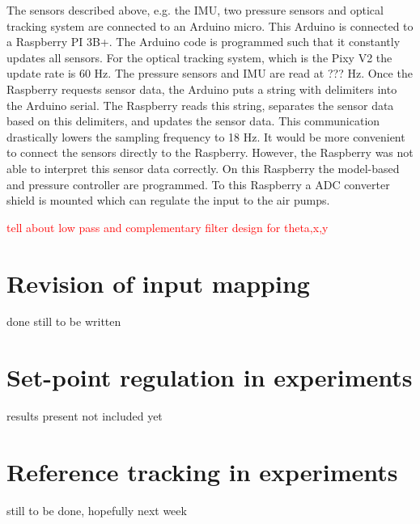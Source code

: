 The sensors described above, e.g. the IMU, two pressure sensors and optical tracking system are connected to an Arduino micro. This Arduino is connected to a Raspberry PI 3B+. The Arduino code is programmed such that it constantly updates all sensors. For the optical tracking system, which is the Pixy V2 the update rate is 60 Hz. The pressure sensors and IMU are read at ??? Hz. Once the Raspberry requests sensor data, the Arduino puts a string with delimiters into the Arduino serial. The Raspberry reads this string, separates the sensor data based on this delimiters, and updates the sensor data. This communication drastically lowers the sampling frequency to 18 Hz. It would be more convenient to connect the sensors directly to the Raspberry. However, the Raspberry was not able to interpret this sensor data correctly. On this Raspberry the model-based and pressure controller are programmed. To this Raspberry a ADC converter shield is mounted which can regulate the input to the air pumps.

\textcolor{red}{tell about low pass and complementary filter design for theta,x,y}


\section{Revision of input mapping}

done still to be written 

\section{Set-point regulation in experiments}

results present not included yet

\section{Reference tracking in experiments}

still to be done, hopefully next week 




